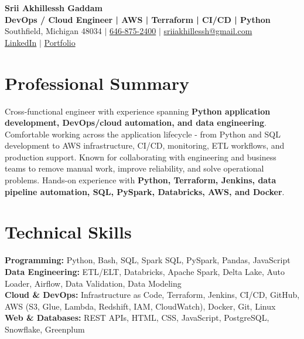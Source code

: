 \documentclass[letterpaper,10pt]{article}
\begin{document}
\fontsize{9.35pt}{10.45pt}\selectfont

\begin{center}
    {\LARGE \textbf{Srii Akhillessh Gaddam}} \\[-1pt]
    \textbf{DevOps / Cloud Engineer | AWS | Terraform | CI/CD | Python} \\[2pt]
    Southfield, Michigan 48034 $|$
    \href{tel:6468752400}{646-875-2400} $|$
    \href{mailto:sriiakhillessh@gmail.com}{sriiakhillessh@gmail.com} \\[1pt]
    \href{https://www.linkedin.com/in/srii-akhiilessh-gaddam-b48668191/}{LinkedIn} $|$
    \href{https://sriiakhillesshg.github.io/portfolio/}{Portfolio}
\end{center}
\vspace{-8pt}

\section{Professional Summary}
\small{Cross-functional engineer with experience spanning \textbf{Python application development, DevOps/cloud automation, and data engineering}. Comfortable working across the application lifecycle - from Python and SQL development to AWS infrastructure, CI/CD, monitoring, ETL workflows, and production support. Known for collaborating with engineering and business teams to remove manual work, improve reliability, and solve operational problems. Hands-on experience with \textbf{Python, Terraform, Jenkins, data pipeline automation, SQL, PySpark, Databricks, AWS, and Docker}.}

\section{Technical Skills}
\small{
\textbf{Programming:} Python, Bash, SQL, Spark SQL, PySpark, Pandas, JavaScript \\
\textbf{Data Engineering:} ETL/ELT, Databricks, Apache Spark, Delta Lake, Auto Loader, Airflow, Data Validation, Data Modeling \\
\textbf{Cloud \& DevOps:} Infrastructure as Code, Terraform, Jenkins, CI/CD, GitHub, AWS (S3, Glue, Lambda, Redshift, IAM, CloudWatch), Docker, Git, Linux \\
\textbf{Web \& Databases:} REST APIs, HTML, CSS, JavaScript, PostgreSQL, Snowflake, Greenplum
}
\end{document}
